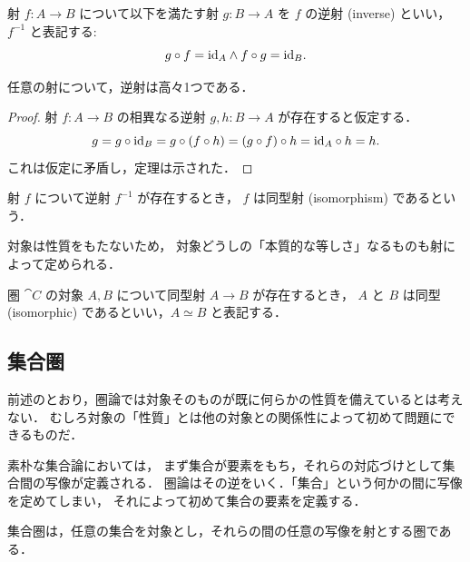 \documentclass[titlepage]{ltjsreport}
\newtheorem[S]{theorem}{定理}[chapter]
\newtheorem[S]{definition}[theorem]{定義}
\newtheorem[S]{example}[theorem]{例}
\begin{document}
\begin{definition}[逆射]
  射 $f:A\to B$ について以下を満たす射 $g:B\to A$ を $f$ の逆射 (inverse) といい，
  $f^{-1}$ と表記する:
  \begin{equation}
    g\circ f=\mathrm{id}_{A}\wedge f\circ g=\mathrm{id}_{B}.
  \end{equation}
\end{definition}

\begin{theorem}[逆射の一意性]
  任意の射について，逆射は高々1つである．
\end{theorem}

\begin{proof}
  射 $f:A\to B$ の相異なる逆射 $g,h:B\to A$ が存在すると仮定する．
  \begin{equation*}
    g=g\circ\mathrm{id}_{B}=g\circ(f\circ h)=(g\circ f)\circ h=\mathrm{id}_{A}\circ h=h.
  \end{equation*}
  これは仮定に矛盾し，定理は示された．
\end{proof}

\begin{definition}[同型射]
  射 $f$ について逆射 $f^{-1}$ が存在するとき，
  $f$ は同型射 (isomorphism) であるという．
\end{definition}

対象は性質をもたないため，
対象どうしの「本質的な等しさ」なるものも射によって定められる．

\begin{definition}[同型]
  圏 $\cat{C}$ の対象 $A,B$ について同型射 $A\to B$ が存在するとき，
  $A$ と $B$ は同型 (isomorphic) であるといい，$A\simeq B$ と表記する．
\end{definition}

\subsection{集合圏}

前述のとおり，圏論では対象そのものが既に何らかの性質を備えているとは考えない．
むしろ対象の「性質」とは他の対象との関係性によって初めて問題にできるものだ．

素朴な集合論においては，
まず集合が要素をもち，それらの対応づけとして集合間の写像が定義される．
圏論はその逆をいく．「集合」という何かの間に写像を定めてしまい，
それによって初めて集合の要素を定義する．

\begin{definition}[集合圏]
  集合圏は，任意の集合を対象とし，それらの間の任意の写像を射とする圏である．
\end{definition}
\end{document}
